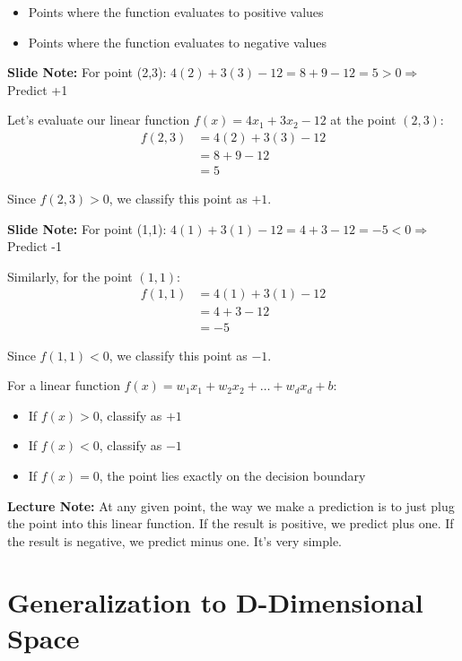 \documentclass{article}
\newcommand{\slidenote}[1]{\begin{mdframed}[backgroundcolor=blue!10, linewidth=0pt]
\textbf{Slide Note:} #1
\end{mdframed}}
\newcommand{\lecturenote}[1]{\begin{mdframed}[backgroundcolor=green!10, linewidth=0pt]
\textbf{Lecture Note:} #1
\end{mdframed}}
\begin{document}
\begin{itemize}
    \item Points where the function evaluates to positive values
    \item Points where the function evaluates to negative values
\end{itemize}

\slidenote{For point (2,3): $4(2) + 3(3) - 12 = 8 + 9 - 12 = 5 > 0 \Rightarrow$ Predict +1}

Let's evaluate our linear function $f(x) = 4x_1 + 3x_2 - 12$ at the point $(2,3)$:
\begin{align}
    f(2,3) &= 4(2) + 3(3) - 12\\
    &= 8 + 9 - 12\\
    &= 5
\end{align}

Since $f(2,3) > 0$, we classify this point as $+1$.

\slidenote{For point (1,1): $4(1) + 3(1) - 12 = 4 + 3 - 12 = -5 < 0 \Rightarrow$ Predict -1}

Similarly, for the point $(1,1)$:
\begin{align}
    f(1,1) &= 4(1) + 3(1) - 12\\
    &= 4 + 3 - 12\\
    &= -5
\end{align}

Since $f(1,1) < 0$, we classify this point as $-1$.

\begin{tcolorbox}[colback=blue!5!white,colframe=blue!75!black,title=Classification Rule]
For a linear function $f(x) = w_1x_1 + w_2x_2 + \ldots + w_dx_d + b$:
\begin{itemize}
    \item If $f(x) > 0$, classify as $+1$
    \item If $f(x) < 0$, classify as $-1$
    \item If $f(x) = 0$, the point lies exactly on the decision boundary
\end{itemize}
\end{tcolorbox}

\lecturenote{At any given point, the way we make a prediction is to just plug the point into this linear function. If the result is positive, we predict plus one. If the result is negative, we predict minus one. It's very simple.}

\section{Generalization to D-Dimensional Space}
\end{document}
